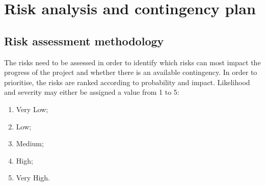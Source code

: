 \documentclass[a4paper]{article}
\begin{document}















\section{Risk analysis and contingency plan}


\subsection{Risk assessment methodology}

The risks need to be assessed in order to identify which risks can most impact the progress of the
project and whether there is an available contingency. In order to prioritise, the risks are ranked
according to probability and impact. Likelihood and severity may either be assigned a value from 1
to 5:

\begin{enumerate}

  \item Very Low;  
  \item Low;         
  \item Medium;   
  \item High; 
  \item Very High.

\end{enumerate}
\end{document}
